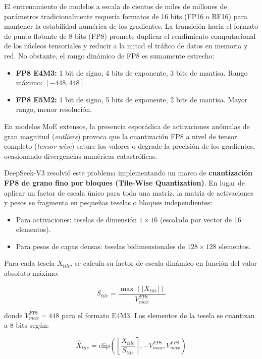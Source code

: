 El entrenamiento de modelos a escala de cientos de miles de millones de parámetros tradicionalmente requería formatos de 16 bits (FP16 o BF16) para mantener la estabilidad numérica de los gradientes. La transición hacia el formato de punto flotante de 8 bits (FP8) promete duplicar el rendimiento computacional de los núcleos tensoriales y reducir a la mitad el tráfico de datos en memoria y red. No obstante, el rango dinámico de FP8 es sumamente estrecho:
\begin{itemize}
    \item \textbf{FP8 E4M3:} 1 bit de signo, 4 bits de exponente, 3 bits de mantisa. Rango máximo: $[-448, 448]$.
    \item \textbf{FP8 E5M2:} 1 bit de signo, 5 bits de exponente, 2 bits de mantisa. Mayor rango, menor resolución.
\end{itemize}

En modelos MoE extensos, la presencia esporádica de activaciones anómalas de gran magnitud (\textit{outliers}) provoca que la cuantización FP8 a nivel de tensor completo (\textit{tensor-wise}) sature los valores o degrade la precisión de los gradientes, ocasionando divergencias numéricas catastróficas.

DeepSeek-V3 resolvió este problema implementando un marco de \textbf{cuantización FP8 de grano fino por bloques (Tile-Wise Quantization)}. En lugar de aplicar un factor de escala único para toda una matriz, la matriz de activaciones y pesos se fragmenta en pequeñas teselas o bloques independientes:
\begin{itemize}
    \item Para activaciones: teselas de dimensión $1 \times 16$ (escalado por vector de 16 elementos).
    \item Para pesos de capas densas: teselas bidimensionales de $128 \times 128$ elementos.
\end{itemize}

Para cada tesela $X_{tile}$, se calcula su factor de escala dinámico en función del valor absoluto máximo:

\begin{equation}
S_{tile} = \frac{\max(|X_{tile}|)}{V_{max}^{FP8}}
\end{equation}

donde $V_{max}^{FP8} = 448$ para el formato E4M3. Los elementos de la tesela se cuantizan a 8 bits según:

\begin{equation}
\hat{X}_{tile} = \mathrm{clip}\left( \left\lfloor \frac{X_{tile}}{S_{tile}} \right\rceil, -V_{max}^{FP8}, V_{max}^{FP8} \right)
\end{equation}

